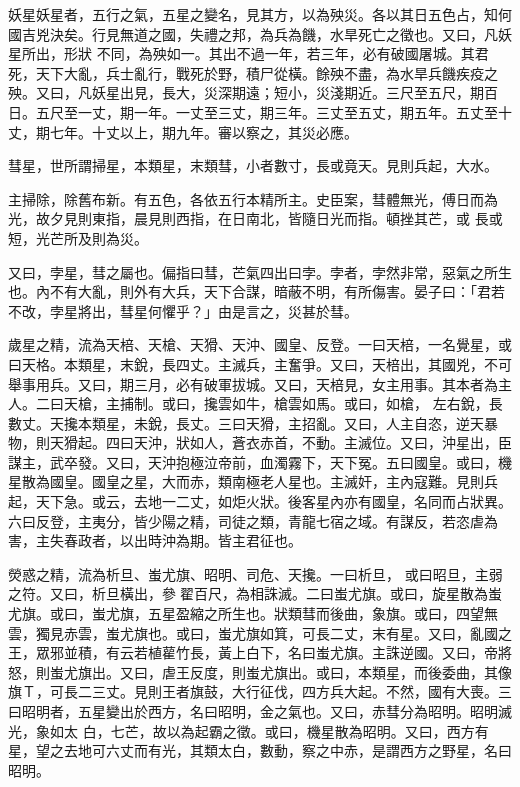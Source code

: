 \begin{pinyinscope}
 妖星妖星者，五行之氣，五星之變名，見其方，以為殃災。各以其日五色占，知何國吉兇決矣。行見無道之國，失禮之邦，為兵為饑，水旱死亡之徵也。又曰，凡妖星所出，形狀
 不同，為殃如一。其出不過一年，若三年，必有破國屠城。其君死，天下大亂，兵士亂行，戰死於野，積尸從橫。餘殃不盡，為水旱兵饑疾疫之殃。又曰，凡妖星出見，長大，災深期遠；短小，災淺期近。三尺至五尺，期百日。五尺至一丈，期一年。一丈至三丈，期三年。三丈至五丈，期五年。五丈至十丈，期七年。十丈以上，期九年。審以察之，其災必應。



 彗星，世所謂掃星，本類星，末類彗，小者數寸，長或竟天。見則兵起，大水。



 主掃除，除舊布新。有五色，各依五行本精所主。史臣案，彗體無光，傅日而為光，故夕見則東指，晨見則西指，在日南北，皆隨日光而指。頓挫其芒，或
 長或短，光芒所及則為災。



 又曰，孛星，彗之屬也。偏指曰彗，芒氣四出曰孛。孛者，孛然非常，惡氣之所生也。內不有大亂，則外有大兵，天下合謀，暗蔽不明，有所傷害。晏子曰：「君若不改，孛星將出，彗星何懼乎？」由是言之，災甚於彗。



 歲星之精，流為天棓、天槍、天猾、天沖、國皇、反登。一曰天棓，一名覺星，或曰天格。本類星，末銳，長四丈。主滅兵，主奮爭。又曰，天棓出，其國兇，不可舉事用兵。又曰，期三月，必有破軍拔城。又曰，天棓見，女主用事。其本者為主人。二曰天槍，主捕制。或曰，攙雲如牛，槍雲如馬。或曰，如槍，
 左右銳，長數丈。天攙本類星，未銳，長丈。三曰天猾，主招亂。又曰，人主自恣，逆天暴物，則天猾起。四曰天沖，狀如人，蒼衣赤首，不動。主滅位。又曰，沖星出，臣謀主，武卒發。又曰，天沖抱極泣帝前，血濁霧下，天下冤。五曰國皇。或曰，機星散為國皇。國皇之星，大而赤，類南極老人星也。主滅奸，主內寇難。見則兵起，天下急。或云，去地一二丈，如炬火狀。後客星內亦有國皇，名同而占狀異。六曰反登，主夷分，皆少陽之精，司徒之類，青龍七宿之域。有謀反，若恣虐為害，主失春政者，以出時沖為期。皆主君征也。



 熒惑之精，流為析旦、蚩尤旗、昭明、司危、天攙。一曰析旦，
 或曰昭旦，主弱之符。又曰，析旦橫出，參翟百尺，為相誅滅。二曰蚩尤旗。或曰，旋星散為蚩尤旗。或曰，蚩尤旗，五星盈縮之所生也。狀類彗而後曲，象旗。或曰，四望無雲，獨見赤雲，蚩尤旗也。或曰，蚩尤旗如箕，可長二丈，末有星。又曰，亂國之王，眾邪並積，有云若植雚竹長，黃上白下，名曰蚩尤旗。主誅逆國。又曰，帝將怒，則蚩尤旗出。又曰，虐王反度，則蚩尤旗出。或曰，本類星，而後委曲，其像旗Ｔ，可長二三丈。見則王者旗鼓，大行征伐，四方兵大起。不然，國有大喪。三曰昭明者，五星變出於西方，名曰昭明，金之氣也。又曰，赤彗分為昭明。昭明滅光，象如太
 白，七芒，故以為起霸之徵。或曰，機星散為昭明。又曰，西方有星，望之去地可六丈而有光，其類太白，數動，察之中赤，是謂西方之野星，名曰昭明。




\end{pinyinscope}

